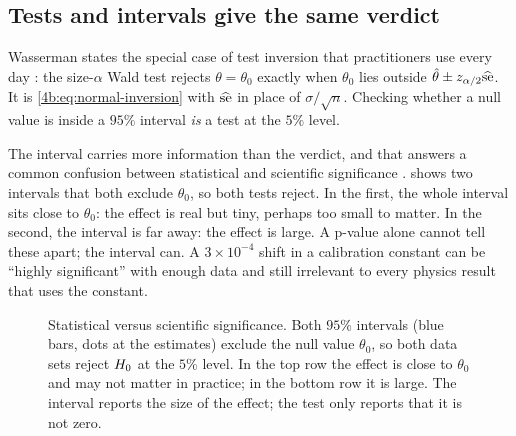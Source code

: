 \subsection{Tests and intervals give the same verdict}
\label{4b:sec:duality}

Wasserman states the special case of test inversion that practitioners use
every day : the size-$\alpha$ Wald test rejects
$\theta=\theta_0$ exactly when $\theta_0$ lies outside
$\hat\theta\pm z_{\alpha/2}\widehat{\rm se}$. It is \eqref{4b:eq:normal-inversion}
with $\widehat{\rm se}$ in place of $\sigma/\sqrt n$. Checking whether a null
value is inside a $95\%$ interval \emph{is} a test at the $5\%$ level.

The interval carries more information than the verdict, and that answers a
common confusion between statistical and scientific significance
.  shows two intervals that both
exclude $\theta_0$, so both tests reject. In the first, the whole interval sits
close to $\theta_0$: the effect is real but tiny, perhaps too small to matter.
In the second, the interval is far away: the effect is large. A p-value alone
cannot tell these apart; the interval can. A $3\times10^{-4}$ shift in a
calibration constant can be ``highly significant'' with enough data and still
irrelevant to every physics result that uses the constant.

\begin{figure}[htbp]
\centering
{}
\caption{Statistical versus scientific significance. Both $95\%$ intervals
(blue bars, dots at the estimates) exclude the null value $\theta_0$, so both
data sets reject $H_0$ at the $5\%$ level. In the top row the effect is
close to $\theta_0$ and may not matter in practice; in the bottom row it is
large. The interval reports the size of the effect; the test only reports that
it is not zero.}
\label{4b:fig:significance}
\end{figure}

